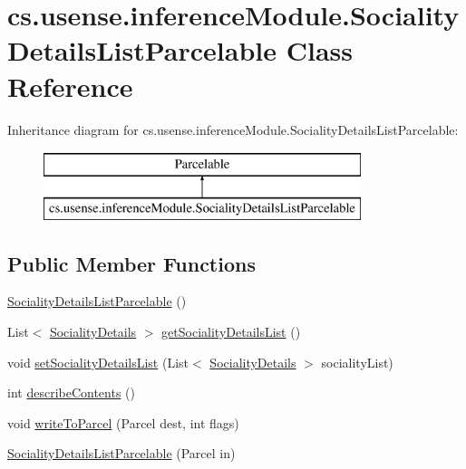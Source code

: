\hypertarget{classcs_1_1usense_1_1inference_module_1_1_sociality_details_list_parcelable}{}\section{cs.\+usense.\+inference\+Module.\+Sociality\+Details\+List\+Parcelable Class Reference}
\label{classcs_1_1usense_1_1inference_module_1_1_sociality_details_list_parcelable}
Inheritance diagram for cs.\+usense.\+inference\+Module.\+Sociality\+Details\+List\+Parcelable\+:\begin{figure}[H]
\begin{center}
\leavevmode
\includegraphics[height=2.000000cm]{classcs_1_1usense_1_1inference_module_1_1_sociality_details_list_parcelable}
\end{center}
\end{figure}
\subsection*{Public Member Functions}
\begin{DoxyCompactItemize}
\item 
\hyperlink{classcs_1_1usense_1_1inference_module_1_1_sociality_details_list_parcelable_a50d705fdd1a117ad6d7ac0ebf090511b}{Sociality\+Details\+List\+Parcelable} ()
\item 
List$<$ \hyperlink{classcs_1_1usense_1_1inference_module_1_1_sociality_details}{Sociality\+Details} $>$ \hyperlink{classcs_1_1usense_1_1inference_module_1_1_sociality_details_list_parcelable_a63f29f905cda8045af9087f0b4e40194}{get\+Sociality\+Details\+List} ()
\item 
void \hyperlink{classcs_1_1usense_1_1inference_module_1_1_sociality_details_list_parcelable_a8ec0b93bce3116b99129d1efa9dc7cee}{set\+Sociality\+Details\+List} (List$<$ \hyperlink{classcs_1_1usense_1_1inference_module_1_1_sociality_details}{Sociality\+Details} $>$ sociality\+List)
\item 
int \hyperlink{classcs_1_1usense_1_1inference_module_1_1_sociality_details_list_parcelable_adaa33c6d5695e5463e3660853dfcb3e4}{describe\+Contents} ()
\item 
void \hyperlink{classcs_1_1usense_1_1inference_module_1_1_sociality_details_list_parcelable_af04f6786ef1b10f3b9d594f7c2687de0}{write\+To\+Parcel} (Parcel dest, int flags)
\item 
\hyperlink{classcs_1_1usense_1_1inference_module_1_1_sociality_details_list_parcelable_adbd5f987fc23f3a9cb68b6cb914c0d4c}{Sociality\+Details\+List\+Parcelable} (Parcel in)
\end{DoxyCompactItemize}
